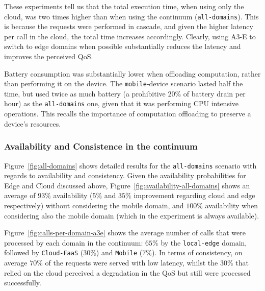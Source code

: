 These experiments tell us that the total execution time, when using only the cloud, was two times higher than when using the continuum (\texttt{all-domains}). This is because the requests were performed in cascade, and given the higher latency per call in the cloud, the total time increases accordingly. Clearly, using A3-E to switch to edge domains when possible substantially reduces the latency and improves the perceived QoS.

Battery consumption was substantially lower when offloading computation, rather than performing it on the device. The \texttt{mobile}-device scenario lasted half the time, but used twice as much battery (a prohibitive $20$\% of battery drain per hour) as the \texttt{all-domains} one, given that it was performing CPU intensive operations. This recalls the importance of computation offloading to preserve a device's resources.

\subsubsection{Availability and Consistence in the continuum}

Figure~\ref{fig:all-domains} shows detailed results for the \texttt{all-domains} scenario with regards to availability and consistency. 
Given the availability probabilities for Edge and Cloud discussed above, Figure~\ref{fig:availability-all-domains} shows an average of $93\%$ availability ($5\%$ and $35\%$ improvement regarding cloud and edge respectively) without considering the mobile domain, and $100\%$ availability when considering also the mobile domain (which in the experiment is always available). 

Figure~\ref{fig:calls-per-domain-a3e} shows the average number of calls that were processed by each domain in the continuum: $65$\% by the \texttt{local-edge} domain, followed by \texttt{Cloud-FaaS} ($30$\%) and \texttt{Mobile} ($7$\%). In terms of consistency, on average $70\%$ of the requests were served with low latency, whilst the $30\%$ that relied on the cloud perceived a degradation in the QoS but still were processed successfully.
 
